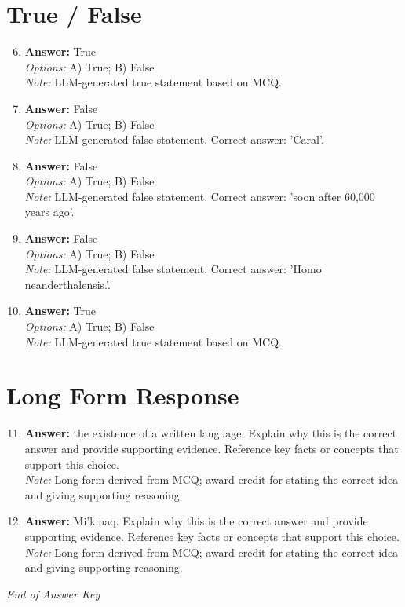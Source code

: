 \documentclass[12pt]{article}
\begin{document}
\section*{True / False}
\begin{enumerate}[label=\arabic*.]
\setcounter{enumi}{5}
\item \textbf{Answer:} True
\\ \textit{Options:} A) True; B) False
\\ \textit{Note:} LLM-generated true statement based on MCQ.
\item \textbf{Answer:} False
\\ \textit{Options:} A) True; B) False
\\ \textit{Note:} LLM-generated false statement. Correct answer: 'Caral'.
\item \textbf{Answer:} False
\\ \textit{Options:} A) True; B) False
\\ \textit{Note:} LLM-generated false statement. Correct answer: 'soon after 60,000 years ago'.
\item \textbf{Answer:} False
\\ \textit{Options:} A) True; B) False
\\ \textit{Note:} LLM-generated false statement. Correct answer: 'Homo neanderthalensis.'.
\item \textbf{Answer:} True
\\ \textit{Options:} A) True; B) False
\\ \textit{Note:} LLM-generated true statement based on MCQ.
\end{enumerate}

\section*{Long Form Response}
\begin{enumerate}[label=\arabic*.]
\setcounter{enumi}{10}
\item \textbf{Answer:} the existence of a written language. Explain why this is the correct answer and provide
supporting evidence. Reference key facts or concepts that support this choice.
\\ \textit{Note:} Long-form derived from MCQ; award credit for stating the correct idea and giving supporting reasoning.
\item \textbf{Answer:} Mi'kmaq. Explain why this is the correct answer and provide supporting evidence. Reference
key facts or concepts that support this choice.
\\ \textit{Note:} Long-form derived from MCQ; award credit for stating the correct idea and giving supporting reasoning.
\end{enumerate}

\vfill
\noindent\textit{End of Answer Key}
\end{document}
